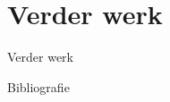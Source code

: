 \documentclass[presentation, bigger]{beamer}
\begin{document}
\section{Verder werk}
\begin{frame}{Verder werk}
\end{frame}

\begin{frame}[allowframebreaks]{Bibliografie}

  \nocite{*}
  \printbibliography
\end{frame}
\end{document}
